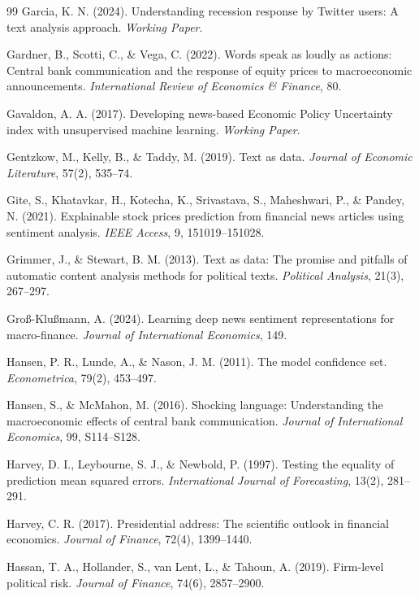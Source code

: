 \documentclass[12pt,oneside]{article}
\begin{document}
\begin{thebibliography}{99}
 Garcia, K. N. (2024). Understanding recession response by Twitter users: A text analysis approach. \textit{Working Paper}.

 Gardner, B., Scotti, C., \& Vega, C. (2022). Words speak as loudly as actions: Central bank communication and the response of equity prices to macroeconomic announcements. \textit{International Review of Economics \& Finance}, 80.

 Gavaldon, A. A. (2017). Developing news-based Economic Policy Uncertainty index with unsupervised machine learning. \textit{Working Paper}.

 Gentzkow, M., Kelly, B., \& Taddy, M. (2019). Text as data. \textit{Journal of Economic Literature}, 57(2), 535--74.

 Gite, S., Khatavkar, H., Kotecha, K., Srivastava, S., Maheshwari, P., \& Pandey, N. (2021). Explainable stock prices prediction from financial news articles using sentiment analysis. \textit{IEEE Access}, 9, 151019--151028.

 Grimmer, J., \& Stewart, B. M. (2013). Text as data: The promise and pitfalls of automatic content analysis methods for political texts. \textit{Political Analysis}, 21(3), 267--297.

 Groß-Klußmann, A. (2024). Learning deep news sentiment representations for macro-finance. \textit{Journal of International Economics}, 149.

 Hansen, P. R., Lunde, A., \& Nason, J. M. (2011). The model confidence set. \textit{Econometrica}, 79(2), 453--497.

 Hansen, S., \& McMahon, M. (2016). Shocking language: Understanding the macroeconomic effects of central bank communication. \textit{Journal of International Economics}, 99, S114--S128.

 Harvey, D. I., Leybourne, S. J., \& Newbold, P. (1997). Testing the equality of prediction mean squared errors. \textit{International Journal of Forecasting}, 13(2), 281--291.

 Harvey, C. R. (2017). Presidential address: The scientific outlook in financial economics. \textit{Journal of Finance}, 72(4), 1399--1440.

 Hassan, T. A., Hollander, S., van Lent, L., \& Tahoun, A. (2019). Firm-level political risk. \textit{Journal of Finance}, 74(6), 2857--2900.


\end{thebibliography}
\end{document}
